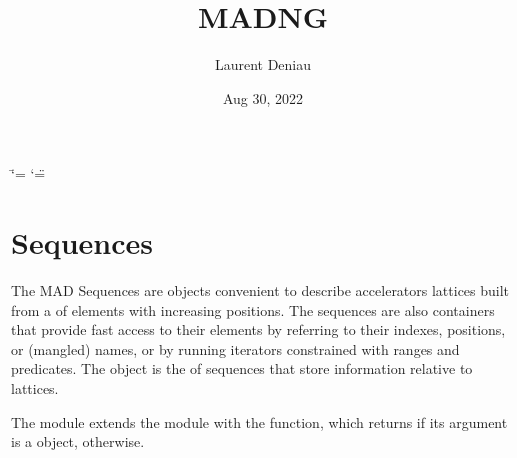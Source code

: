 \documentclass[letterpaper,10pt,english]{sphinxmanual}
\title{MAD\sphinxhyphen{}NG}
\date{Aug 30, 2022}
\author{Laurent Deniau}
\begin{document}
\ifdefined\shorthandoff
  \ifnum\catcode`\=\string=\active\shorthandoff{=}\fi
  \ifnum\catcode`\"=\active{}\fi
\fi

\pagestyle{empty}
\sphinxmaketitle
\pagestyle{plain}
\sphinxtableofcontents
\pagestyle{normal}
\label{\detokenize{index::doc}}


\sphinxstepscope


\chapter{Sequences}
\label{\detokenize{sequences:sequences}}\label{\detokenize{sequences::doc}}
\sphinxAtStartPar
The MAD Sequences are objects convenient to describe accelerators lattices built from a  of elements with increasing \sphinxhyphen{}positions. The sequences are also containers that provide fast access to their elements by referring to their indexes, \sphinxhyphen{}positions, or (mangled) names, or by running iterators constrained with ranges and predicates.
The  object is the  of sequences that store information relative to lattices.

\sphinxAtStartPar
The  module extends the {\hyperref[\detokenize{types::doc}]{}} module with the  function, which returns  if its argument is a  object,  otherwise.
\end{document}
